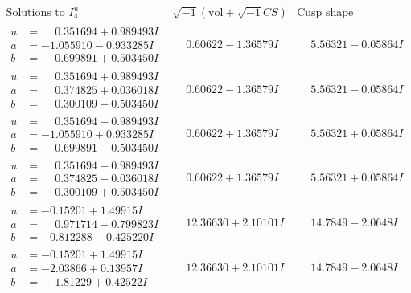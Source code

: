 \documentclass[1p]{elsarticle_modified}
\theoremstyle{definition}
\newcommand{\I}{\sqrt{-1}}
\begin{document}
$$\begin{array}{c|c|c}  
\text{Solutions to }I^u_{4}& \I (\text{vol} + \sqrt{-1}CS) & \text{Cusp shape}\\
 \hline 
\begin{aligned}
u &= \phantom{-}0.351694 + 0.989493 I \\
a &= -1.055910 - 0.933285 I \\
b &= \phantom{-}0.699891 + 0.503450 I\end{aligned}
 & \phantom{-}0.60622 - 1.36579 I & \phantom{-}5.56321 - 0.05864 I \\ \hline\begin{aligned}
u &= \phantom{-}0.351694 + 0.989493 I \\
a &= \phantom{-}0.374825 + 0.036018 I \\
b &= \phantom{-}0.300109 - 0.503450 I\end{aligned}
 & \phantom{-}0.60622 - 1.36579 I & \phantom{-}5.56321 - 0.05864 I \\ \hline\begin{aligned}
u &= \phantom{-}0.351694 - 0.989493 I \\
a &= -1.055910 + 0.933285 I \\
b &= \phantom{-}0.699891 - 0.503450 I\end{aligned}
 & \phantom{-}0.60622 + 1.36579 I & \phantom{-}5.56321 + 0.05864 I \\ \hline\begin{aligned}
u &= \phantom{-}0.351694 - 0.989493 I \\
a &= \phantom{-}0.374825 - 0.036018 I \\
b &= \phantom{-}0.300109 + 0.503450 I\end{aligned}
 & \phantom{-}0.60622 + 1.36579 I & \phantom{-}5.56321 + 0.05864 I \\ \hline\begin{aligned}
u &= -0.15201 + 1.49915 I \\
a &= \phantom{-}0.971714 - 0.799823 I \\
b &= -0.812288 - 0.425220 I\end{aligned}
 & \phantom{-}12.36630 + 2.10101 I & \phantom{-}14.7849 - 2.0648 I \\ \hline\begin{aligned}
u &= -0.15201 + 1.49915 I \\
a &= -2.03866 + 0.13957 I \\
b &= \phantom{-}1.81229 + 0.42522 I\end{aligned}
 & \phantom{-}12.36630 + 2.10101 I & \phantom{-}14.7849 - 2.0648 I \\ \hline\begin{aligned}

\end{aligned}
\end{array}$$
\end{document}
